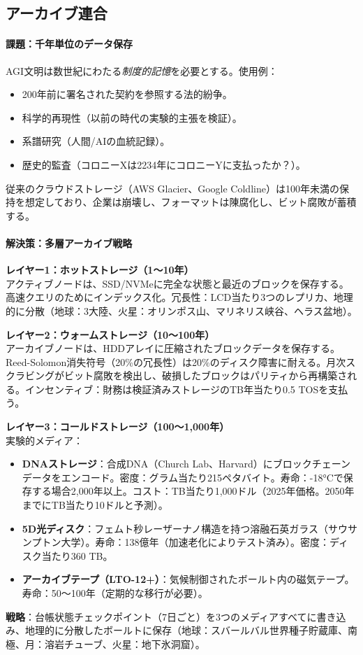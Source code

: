 \documentclass[11pt]{article}
\begin{document}
\subsection{アーカイブ連合}

\paragraph{課題：千年単位のデータ保存}
AGI文明は数世紀にわたる\emph{制度的記憶}を必要とする。使用例：
\begin{itemize}[noitemsep]
  \item 200年前に署名された契約を参照する法的紛争。
  \item 科学的再現性（以前の時代の実験的主張を検証）。
  \item 系譜研究（人間/AIの血統記録）。
  \item 歴史的監査（コロニーXは2234年にコロニーYに支払ったか？）。
\end{itemize}
従来のクラウドストレージ（AWS Glacier、Google Coldline）は100年未満の保持を想定しており、企業は崩壊し、フォーマットは陳腐化し、ビット腐敗が蓄積する。

\paragraph{解決策：多層アーカイブ戦略}

\textbf{レイヤー1：ホットストレージ（1〜10年）}\\
アクティブノードは、SSD/NVMeに完全な状態と最近のブロックを保存する。高速クエリのためにインデックス化。冗長性：LCD当たり3つのレプリカ、地理的に分散（地球：3大陸、火星：オリンポス山、マリネリス峡谷、ヘラス盆地）。

\textbf{レイヤー2：ウォームストレージ（10〜100年）}\\
アーカイブノードは、HDDアレイに圧縮されたブロックデータを保存する。Reed-Solomon消失符号（20\%の冗長性）は20\%のディスク障害に耐える。月次スクラビングがビット腐敗を検出し、破損したブロックはパリティから再構築される。インセンティブ：財務は検証済みストレージのTB年当たり0.5 TOSを支払う。

\textbf{レイヤー3：コールドストレージ（100〜1,000年）}\\
実験的メディア：
\begin{itemize}[noitemsep]
  \item \textbf{DNAストレージ}：合成DNA（Church Lab、Harvard）にブロックチェーンデータをエンコード。密度：グラム当たり215ペタバイト。寿命：-18°Cで保存する場合2,000年以上。コスト：TB当たり1,000ドル（2025年価格。2050年までにTB当たり10ドルと予測）。
  \item \textbf{5D光ディスク}：フェムト秒レーザーナノ構造を持つ溶融石英ガラス（サウサンプトン大学）。寿命：138億年（加速老化によりテスト済み）。密度：ディスク当たり360 TB。
  \item \textbf{アーカイブテープ（LTO-12+）}：気候制御されたボールト内の磁気テープ。寿命：50〜100年（定期的な移行が必要）。
\end{itemize}
\textbf{戦略}：台帳状態チェックポイント（7日ごと）を3つのメディアすべてに書き込み、地理的に分散したボールトに保存（地球：スバールバル世界種子貯蔵庫、南極、月：溶岩チューブ、火星：地下氷洞窟）。
\end{document}
